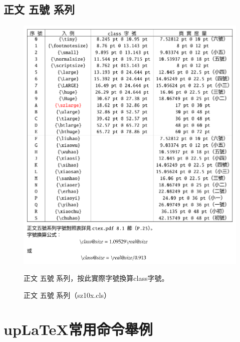\subsection{正文 五號 系列}
\begin{figure}[H]
\begin{center}
\caption{正文 五號 系列（sz10x.cls）}
{ \includegraphics[scale=1]{figures/sz10x.pdf}}
\end{center}
\par 正文  五號  系列，按此實際字號換算class字號。
\end{figure}



\section{up{\LaTeX}常用命令舉例}

